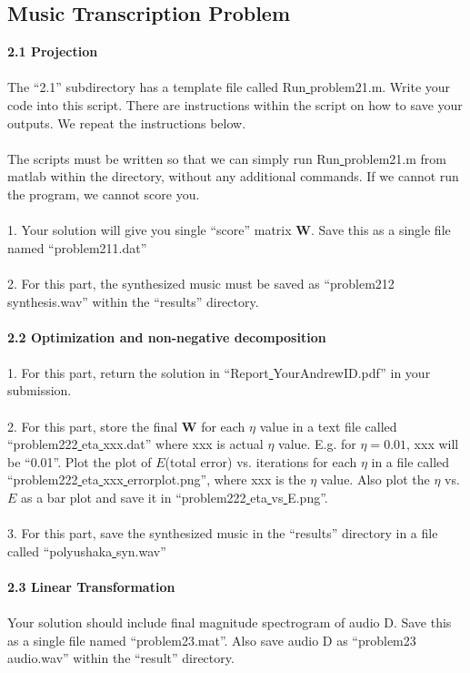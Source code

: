 \subsection{Music Transcription Problem}
\textbf{2.1 Projection}\\
\\
The ``2.1'' subdirectory has a template file called Run\underline{ }problem21.m. Write your code into this script. There are instructions within the script on how to save your outputs. We repeat the instructions below.\\
\\
The scripts must be written so that we can simply run Run\underline{ }problem21.m from matlab within the directory, without any additional commands. If we cannot run the program, we cannot score you.\\
\\
1. Your solution will give you single ``score'' matrix $\mathbf{W}$. Save this as a single file named ``problem211.dat''
\\
\\
2. For this part, the synthesized music must be saved as ``problem212\underline{ }synthesis.wav'' within the ``results'' directory.\\
\\
\textbf{2.2 Optimization and non-negative decomposition}
\\
\\
1. For this part, return the solution in ``Report\underline{ }YourAndrewID.pdf'' in your submission.\\
\\
2. For this part, store the final $\mathbf{W}$ for each $\eta$ value in a text file called ``problem222\underline{ }eta\underline{ }xxx.dat'' where xxx is actual $\eta$ value. E.g. for $\eta = 0.01$, xxx will be ``0.01''. Plot the plot of $E$(total error) vs. iterations for each $\eta$ in a file called ``problem222\underline{ }eta\underline{ }xxx\underline{ }errorplot.png'', where xxx is the $\eta$ value. Also plot the $\eta$ vs. $E$ as a bar plot and save it in ``problem222\underline{ }eta\underline{ }vs\underline{ }E.png''.\\
\\
3. For this part, save the synthesized music in the ``results'' directory in a file called ``polyushaka\underline{ }syn.wav''\\
\\
\textbf{2.3 Linear Transformation}\\
\\
Your solution should include final magnitude spectrogram of audio D. Save this as a single file named ``problem23.mat''. Also save audio D as ``problem23\underline{ }audio.wav'' within the ``result'' directory. 
